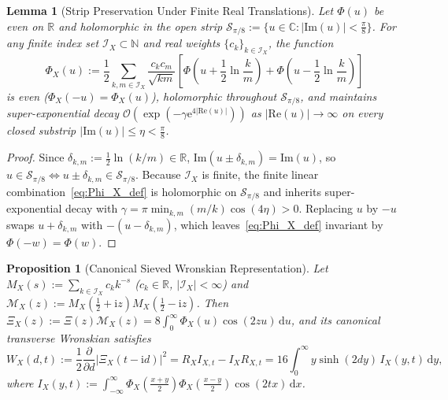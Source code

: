\documentclass[11pt,reqno]{amsart}
\newtheorem{proposition}[theorem]{Proposition}
\newtheorem{lemma}[theorem]{Lemma}
\theoremstyle{definition}
\theoremstyle{remark}
\numberwithin{equation}{section}
\newcommand{\R}{\mathbb{R}}
\newcommand{\C}{\mathbb{C}}
\newcommand{\N}{\mathbb{N}}
\newcommand{\dd}{\mathrm{d}}
\newcommand{\ii}{\mathrm{i}}
\newcommand{\ee}{\mathrm{e}}
\newcommand{\Rea}{\mathrm{Re}}
\newcommand{\Ima}{\mathrm{Im}}
\begin{document}
\begin{lemma}[Strip Preservation Under Finite Real Translations]\label{lem:strip_shift}
Let $\Phi(u)$ be even on $\R$ and holomorphic in the open strip $\mathcal{S}_{\pi/8} := \{u \in \C : \lvert\Ima(u)\rvert < \frac{\pi}{8}\}$. For any finite index set $\mathcal{I}_X \subset \N$ and real weights $\{c_k\}_{k \in \mathcal{I}_X}$, the function
\begin{equation}\label{eq:Phi_X_def}
\Phi_X(u) := \frac{1}{2}\sum_{k,m \in \mathcal{I}_X} \frac{c_k c_m}{\sqrt{km}}\left[\Phi\!\left(u + \frac{1}{2}\ln\frac{k}{m}\right) + \Phi\!\left(u - \frac{1}{2}\ln\frac{k}{m}\right)\right]
\end{equation}
is even ($\Phi_X(-u) = \Phi_X(u)$), holomorphic throughout $\mathcal{S}_{\pi/8}$, and maintains super-exponential decay $\mathcal{O}(\exp(-\gamma\ee^{4\lvert\Rea(u)\rvert}))$ as $\lvert\Rea(u)\rvert \to \infty$ on every closed substrip $\lvert\Ima(u)\rvert \le \eta < \frac{\pi}{8}$.
\end{lemma}

\begin{proof}
Since $\delta_{k,m} := \frac{1}{2}\ln(k/m) \in \R$, $\Ima(u \pm \delta_{k,m}) = \Ima(u)$, so $u \in \mathcal{S}_{\pi/8} \iff u \pm \delta_{k,m} \in \mathcal{S}_{\pi/8}$. Because $\mathcal{I}_X$ is finite, the finite linear combination~\eqref{eq:Phi_X_def} is holomorphic on $\mathcal{S}_{\pi/8}$ and inherits super-exponential decay with $\gamma = \pi\min_{k,m}(m/k)\cos(4\eta) > 0$. Replacing $u$ by $-u$ swaps $u + \delta_{k,m}$ with $-(u - \delta_{k,m})$, which leaves~\eqref{eq:Phi_X_def} invariant by $\Phi(-w) = \Phi(w)$.
\end{proof}

\begin{proposition}[Canonical Sieved Wronskian Representation]\label{prop:sieved_wronskian}
Let $M_X(s) := \sum_{k \in \mathcal{I}_X} c_k k^{-s}$ ($c_k \in \R$, $\lvert\mathcal{I}_X\rvert < \infty$) and $\mathcal{M}_X(z) := M_X(\frac{1}{2}+\ii z)M_X(\frac{1}{2}-\ii z)$. Then $\Xi_X(z) := \Xi(z)\mathcal{M}_X(z) = 8\int_0^{\infty} \Phi_X(u)\cos(2zu)\,\dd u$, and its canonical transverse Wronskian satisfies
\begin{equation}\label{eq:WX_boxed}
\boxed{W_X(d,t) := \frac{1}{2}\frac{\partial}{\partial d}\bigl\lvert\Xi_X(t - \ii d)\bigr\rvert^2 = R_X I_{X,t} - I_X R_{X,t} = 16\int_0^{\infty} y\sinh(2dy)\,I_X(y,t)\,\dd y,}
\end{equation}
where $I_X(y,t) := \int_{-\infty}^{\infty} \Phi_X(\frac{x+y}{2})\Phi_X(\frac{x-y}{2})\cos(2tx)\,\dd x$.
\end{proposition}
\end{document}
